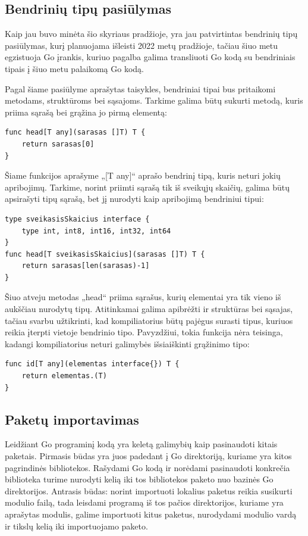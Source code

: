 \documentclass{VUMIFPSbakalaurinis}
\begin{document}
\subsection{Bendrinių tipų pasiūlymas}
Kaip jau buvo minėta šio skyriaus pradžioje, yra jau patvirtintas bendrinių tipų pasiūlymas, kurį planuojama išleisti 2022 metų pradžioje, tačiau šiuo metu egzistuoja Go įrankis, kuriuo pagalba galima transliuoti Go kodą su bendriniais tipais į šiuo metu palaikomą Go kodą.\par Pagal šiame pasiūlyme aprašytas taisykles, bendriniai tipai bus pritaikomi metodams, struktūroms bei sąsajoms. Tarkime galima būtų sukurti metodą, kuris priima sąrašą bei grąžina jo pirmą elementą:
\begin{lstlisting}[language=GoCust] 
func head[T any](sarasas []T) T {
	return sarasas[0]
}
	\end{lstlisting}
Šiame funkcijos aprašyme „[T any]“ aprašo bendrinį tipą, kuris neturi jokių apribojimų. Tarkime, norint priimti sąrašą tik iš sveikųjų skaičių, galima būtų apsirašyti tipų sąrašą, bet jį nurodyti kaip apribojimą bendriniui tipui:
\begin{lstlisting}[language=GoCust]
type sveikasisSkaicius interface {
	type int, int8, int16, int32, int64
}
func head[T sveikasisSkaicius](sarasas []T) T {
	return sarasas[len(sarasas)-1]
}
	\end{lstlisting}
	Šiuo atveju metodas „head“ priima sąrašus, kurių elementai yra tik vieno iš aukščiau nurodytų tipų. Atitinkamai galima apibrėžti ir struktūras bei sąsajas, tačiau svarbu užtikrinti, kad kompiliatorius būtų pajėgus surasti tipus, kuriuos reikia įterpti vietoje bendrinio tipo. Pavyzdžiui, tokia funkcija nėra teisinga, kadangi kompiliatorius neturi galimybės išsiaiškinti grąžinimo tipo:
	\begin{lstlisting}[language=GoCust] 
func id[T any](elementas interface{}) T {
	return elementas.(T)
}
\end{lstlisting}
\subsection{Paketų importavimas}
Leidžiant Go programinį kodą yra keletą galimybių kaip pasinaudoti kitais paketais. Pirmasis būdas yra juos padedant į Go direktoriją, kuriame yra kitos pagrindinės bibliotekos. Rašydami Go kodą ir norėdami pasinaudoti konkrečia biblioteka turime nurodyti kelią iki tos bibliotekos paketo nuo bazinės Go direktorijos. Antrasis būdas: norint importuoti lokalius paketus reikia susikurti modulio failą, tada leisdami programą iš tos pačios direktorijos, kuriame yra aprašytas modulis, galime importuoti kitus paketus, nurodydami modulio vardą ir tikslų kelią iki importuojamo paketo.
\end{document}
